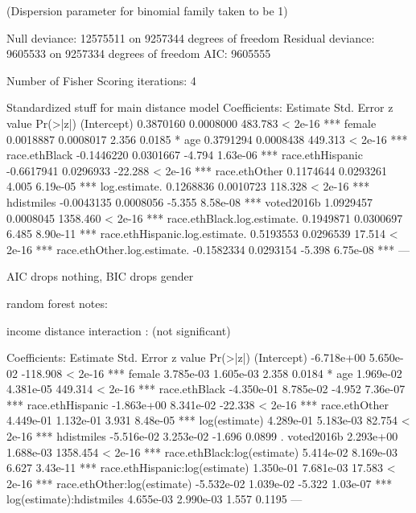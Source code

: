 (Dispersion parameter for binomial family taken to be 1)

    Null deviance: 12575511  on 9257344  degrees of freedom
Residual deviance:  9605533  on 9257334  degrees of freedom
AIC: 9605555

Number of Fisher Scoring iterations: 4



Standardized stuff for main distance model
Coefficients:
                                 Estimate Std. Error  z value Pr(>|z|)    
(Intercept)                     0.3870160  0.0008000  483.783  < 2e-16 ***
female                          0.0018887  0.0008017    2.356   0.0185 *  
age                             0.3791294  0.0008438  449.313  < 2e-16 ***
race.ethBlack                  -0.1446220  0.0301667   -4.794 1.63e-06 ***
race.ethHispanic               -0.6617941  0.0296933  -22.288  < 2e-16 ***
race.ethOther                   0.1174644  0.0293261    4.005 6.19e-05 ***
log.estimate.                   0.1268836  0.0010723  118.328  < 2e-16 ***
hdistmiles                     -0.0043135  0.0008056   -5.355 8.58e-08 ***
voted2016b                      1.0929457  0.0008045 1358.460  < 2e-16 ***
race.ethBlack.log.estimate.     0.1949871  0.0300697    6.485 8.90e-11 ***
race.ethHispanic.log.estimate.  0.5193553  0.0296539   17.514  < 2e-16 ***
race.ethOther.log.estimate.    -0.1582334  0.0293154   -5.398 6.75e-08 ***
---


AIC drops nothing, BIC drops gender

random forest notes:



income distance interaction : (not significant)

Coefficients:
                                 Estimate Std. Error  z value Pr(>|z|)    
(Intercept)                    -6.718e+00  5.650e-02 -118.908  < 2e-16 ***
female                          3.785e-03  1.605e-03    2.358   0.0184 *  
age                             1.969e-02  4.381e-05  449.314  < 2e-16 ***
race.ethBlack                  -4.350e-01  8.785e-02   -4.952 7.36e-07 ***
race.ethHispanic               -1.863e+00  8.341e-02  -22.338  < 2e-16 ***
race.ethOther                   4.449e-01  1.132e-01    3.931 8.48e-05 ***
log(estimate)                   4.289e-01  5.183e-03   82.754  < 2e-16 ***
hdistmiles                     -5.516e-02  3.253e-02   -1.696   0.0899 .  
voted2016b                      2.293e+00  1.688e-03 1358.454  < 2e-16 ***
race.ethBlack:log(estimate)     5.414e-02  8.169e-03    6.627 3.43e-11 ***
race.ethHispanic:log(estimate)  1.350e-01  7.681e-03   17.583  < 2e-16 ***
race.ethOther:log(estimate)    -5.532e-02  1.039e-02   -5.322 1.03e-07 ***
log(estimate):hdistmiles        4.655e-03  2.990e-03    1.557   0.1195    
---



